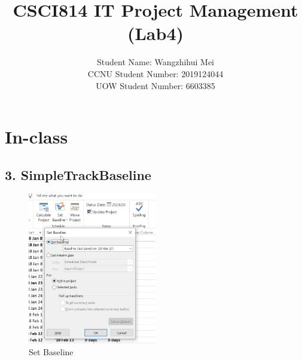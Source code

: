 \documentclass[runningheads]{llncs}
\begin{document}
\title{\large{CSCI814 IT Project Management (Lab4)}}

%
%
\author{\large{Student Name: Wangzhihui Mei \\ %
CCNU Student Number: 2019124044 \\ %
UOW Student Number: 6603385}}  %







\maketitle
\clearpage


\section*{In-class}
\subsection*{3. SimpleTrackBaseline}
\begin{figure}[H]
    \centering
    \includegraphics[width=0.5\textwidth]{./image/t2f1}
    \caption{Set Baseline}
\end{figure}
\end{document}
